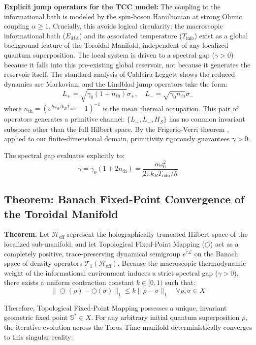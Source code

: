 \documentclass[12pt,openany]{book}
\theoremstyle{plain}
\theoremstyle{definition}
\theoremstyle{remark}
\begin{document}
\textbf{Explicit jump operators for the TCC model:} The coupling to the informational bath is modeled by the spin-boson Hamiltonian at strong Ohmic coupling $\alpha \ge 1$. Crucially, this avoids logical circularity: the macroscopic informational bath ($E_{MA}$) and its associated temperature ($T_{\text{info}}$) exist as a global background feature of the Toroidal Manifold, independent of any localized quantum superposition. The local system is driven to a spectral gap ($\gamma > 0$) because it falls into this pre-existing global reservoir, not because it generates the reservoir itself. The standard analysis of Caldeira-Leggett shows the reduced dynamics are Markovian, and the Lindblad jump operators take the form:
$$L_+ = \sqrt{\gamma_0 (1 + n_\text{th})} \sigma_+, \quad L_- = \sqrt{\gamma_0 n_\text{th}} \sigma_-$$
where $n_\text{th} = (e^{\hbar\omega_0/k_B T_{\text{info}}} - 1)^{-1}$ is the mean thermal occupation. This pair of operators generates a primitive channel: $\{L_+, L_-, H_S\}$ has no common invariant subspace other than the full Hilbert space. By the Frigerio-Verri theorem \cite{frigerio1982}, applied to our finite-dimensional domain, primitivity rigorously guarantees $\gamma > 0$.

The spectral gap evaluates explicitly to:
\begin{equation}
\gamma = \gamma_0 (1 + 2n_\text{th}) = \frac{\alpha \omega_0^2}{2\pi k_B T_{\text{info}}/\hbar}
\end{equation}

\subsection{Theorem: Banach Fixed-Point Convergence of the Toroidal Manifold}

\textbf{Theorem.} Let $\mathcal{H}_{\text{eff}}$ represent the holographically truncated Hilbert space of the localized sub-manifold, and let Topological Fixed-Point Mapping ($\bigcirc$) act as a completely positive, trace-preserving dynamical semigroup $e^{\tilde{\tau}\mathcal{L}}$ on the Banach space of density operators $\mathcal{T}_1(\mathcal{H}_{\text{eff}})$. Because the macroscopic thermodynamic weight of the informational environment induces a strict spectral gap ($\gamma > 0$), there exists a uniform contraction constant $k \in [0, 1)$ such that:
$$\|\bigcirc(\rho) - \bigcirc(\sigma)\|_1 \le k \|\rho - \sigma\|_1 \quad \forall \rho, \sigma \in X$$

Therefore, Topological Fixed-Point Mapping possesses a unique, invariant geometric fixed point $\mathbb{S}^* \in X$. For any arbitrary initial quantum superposition $\rho$, the iterative evolution across the Torus-Time manifold deterministically converges to this singular reality:
\end{document}
